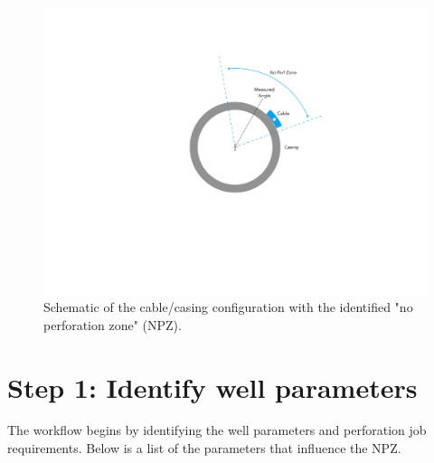 \documentclass[paper=a4, fontsize=11pt]{scrartcl}
\numberwithin{equation}{section}		%
\numberwithin{figure}{section}			%
\numberwithin{table}{section}				%
\begin{document}
\begin{figure}[ht!]
    \caption{Schematic of the cable/casing configuration with the identified "no perforation zone" (NPZ).}
    \label{fig:well_schematic}
    \centering
    \includegraphics[width=1.0\textwidth]{figures/well_schematic.pdf}
\end{figure}

\section{Step 1: Identify well parameters}
\label{step_1}
The workflow begins by identifying the well parameters and perforation job requirements.  Below is a list of the parameters that influence the NPZ.
\end{document}
